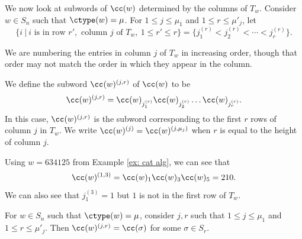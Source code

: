 We now look at subwords of $\cc(w)$ determined by the columns of $T_w$. Consider $w\in S_n$ such that $\ctype(w) = \mu$.
For $1\leq j \leq \mu_1$ and $1\leq r \leq \mu'_j$, let \[\{i \ | \ i \text{ is in row } r', \text{ column } j \text{ of } T_w, \ 1\leq r' \leq r\} = \{j^{(r)}_1 < j^{(r)}_2 < \cdots < j^{(r)}_r\}.\]

We are numbering the entries in column $j$ of $T_w$ in increasing order, though that order may not match the order in which they appear in the column. 

We define the subword $\cc(w)^{(j,r)}$ of $\cc(w)$ to be \[\cc(w)^{(j,r)} = \cc(w)_{j^{(r)}_1}\cc(w)_{j^{(r)}_2}\dots \cc(w)_{j^{(r)}_r}.\]
In this case, $\cc(w)^{(j,r)}$ is the subword corresponding to the first $r$ rows of column $j$ in $T_w$. We write $\cc(w)^{(j)} = \cc(w)^{(j,\mu_j)}$ when $r$ is equal to the height of column $j$.


\begin{ex}
   Using $w=  634125 $ from Example \ref{ex: cat alg}, we can see that \[\cc(w)^{(1,3)} = \cc(w)_1\cc(w)_3\cc(w)_5 = 210.\]
We can also see that $j^{(3)}_1 = 1$ but $1$ is not in the first row of $T_w$. 
\end{ex}


\begin{prop}\label{prop: subword of column is a cocharge word}
For $w\in S_n$ such that $\ctype(w) = \mu$, consider $j,r$ such that $1\leq j \leq \mu_1$ and $1\leq r \leq \mu'_j$.
Then $\cc(w)^{(j,r)} = \cc(\sigma)$ for some $\sigma \in S_r$.
\end{prop}

